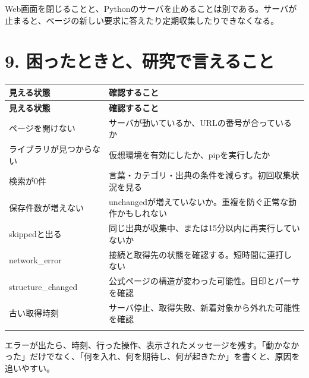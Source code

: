 \documentclass[a4paper,10pt]{ltjsarticle}
\begin{document}
Web画面を閉じることと、Pythonのサーバを止めることは別である。サーバが止まると、ページの新しい要求に答えたり定期収集したりできなくなる。


\clearpage

\section*{9. 困ったときと、研究で言えること}

{\small\begin{longtable}{@{}>{\raggedright\arraybackslash}p{}>{\raggedright\arraybackslash}p{}@{}}

\rowcolor{Pale}\textbf{見える状態} & \textbf{確認すること} \\ \midrule

\endfirsthead

\rowcolor{Pale}\textbf{見える状態} & \textbf{確認すること} \\ \midrule\endhead

ページを開けない & サーバが動いているか、URLの番号が合っているか \\ \addlinespace[3pt]

ライブラリが見つからない & 仮想環境を有効にしたか、pipを実行したか \\ \addlinespace[3pt]

検索が0件 & 言葉・カテゴリ・出典の条件を減らす。初回収集状況を見る \\ \addlinespace[3pt]

保存件数が増えない & unchangedが増えていないか。重複を防ぐ正常な動作かもしれない \\ \addlinespace[3pt]

skippedと出る & 同じ出典が収集中、または15分以内に再実行していないか \\ \addlinespace[3pt]

network\_error & 接続と取得先の状態を確認する。短時間に連打しない \\ \addlinespace[3pt]

structure\_changed & 公式ページの構造が変わった可能性。目印とパーサを確認 \\ \addlinespace[3pt]

古い取得時刻 & サーバ停止、取得失敗、新着対象から外れた可能性を確認 \\ \addlinespace[3pt]

\bottomrule\end{longtable}}

エラーが出たら、時刻、行った操作、表示されたメッセージを残す。「動かなかった」だけでなく、「何を入れ、何を期待し、何が起きたか」を書くと、原因を追いやすい。
\end{document}

